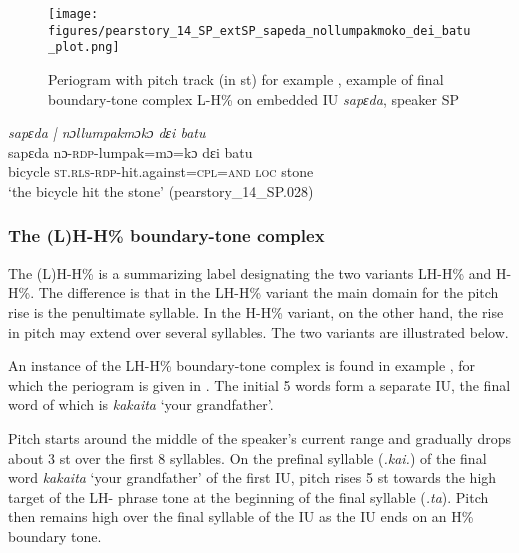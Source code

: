 \begin{figure}
	\texttt{[image: figures/pearstory\_14\_SP\_extSP\_sapeda\_nollumpakmoko\_dei\_batu\_plot.png]}
	\caption{Periogram with pitch track (in st) for example , example of final boundary-tone complex L-H\% on embedded IU \textit{sapɛda},  speaker SP}
	\label{pitch:sapeda nollumpakmoko dɛi batu}
\end{figure}

\ea
\label{ex:sapeda nollumpakmoko dɛi batu}
\textit{sapɛda | nɔllumpakmɔkɔ dɛi batu} \\
\gll sapɛda  nɔ-\textsc{rdp-}lumpak=mɔ=kɔ  dɛi batu  \\
bicycle \textsc{st.rls}-\textsc{rdp}-hit.against=\textsc{cpl}=\textsc{and} \textsc{loc} stone\\ 
\glt ‘the bicycle hit the stone’ \hfill(pearstory\_14\_SP.028)
\z


\subsubsection{The (L)H-H\% boundary-tone complex}

The (L)H-H\% is a summarizing label designating the two variants LH-H\% and H-H\%.  The difference is that in the LH-H\% variant the main domain for the pitch rise is the penultimate syllable. In the H-H\% variant, on the other hand, the rise in pitch may extend over several syllables. The two  variants  are illustrated below.

An instance of the LH-H\% boundary-tone complex is found in example  , for which the periogram is given in  . The initial 5 words form a separate IU, the final word of which is \textit{kakaita} ‘your grandfather’.

Pitch starts around the middle of the speaker's current range and gradually drops about 3 st over the first 8 syllables. On the prefinal syllable (\textit{.kai.}) of the final word  \textit{kakaita} `your grandfather' of the first IU, pitch rises 5 st towards the high target of the LH- phrase tone at the beginning of the final syllable (\textit{.ta}). Pitch then remains high over the final syllable of the IU as the IU ends on an H\% boundary tone. 







